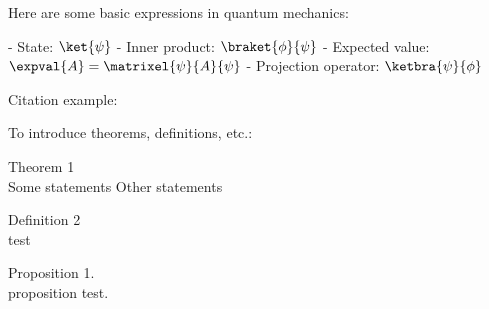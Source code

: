 Here are some basic expressions in quantum mechanics:

- State: \( \ket{\psi} \)
- Inner product: \( \braket{\phi}{\psi} \)
- Expected value: \( \expval{A} = \matrixel{\psi}{A}{\psi} \)
- Projection operator: \( \ketbra{\psi}{\phi} \)



Citation example: \autocite{bell1964}


To introduce theorems, definitions, etc.:
\begin{thm}
    Theorem 1\\
    Some statements
    Other statements
\end{thm}

\begin{defn}
    Definition 2\\
    test\\
\end{defn}

\begin{prop}
    Proposition 1. \\ proposition test.
\end{prop}